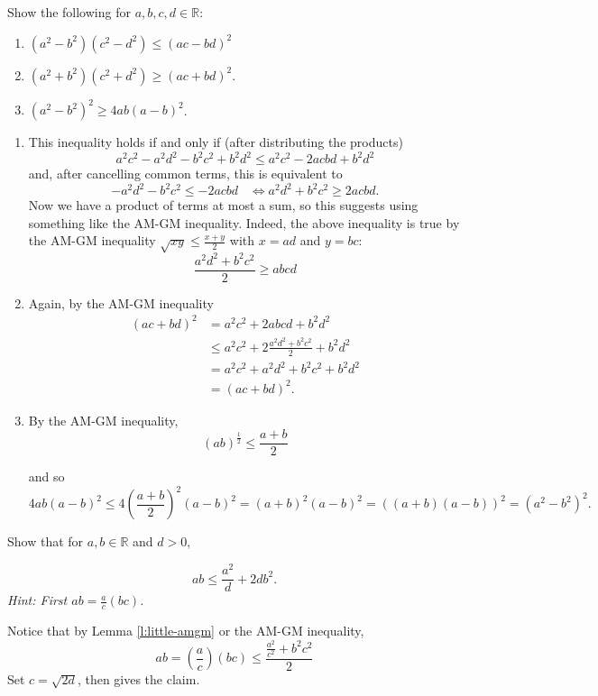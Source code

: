 \documentclass[11pt,dvipsnames]{book}
\def\R{\mathbb{R}}
\numberwithin{figure}{section} %
\numberwithin{table}{section} %
\begin{document}
\begin{exercise} Show the following for $a,b,c,d\in\mathbb{R}$:
\begin{enumerate}[label=(\alph*)]
\item $(a^{2}-b^{2})(c^2-d^2)\leq (ac-bd)^2 $
\item $(a^2+b^2)(c^2+d^2)\geq (ac+bd)^2$.
\item $(a^2-b^2)^2\geq 4ab(a-b)^2$.
\end{enumerate}

\begin{solution}
\begin{enumerate}[label=(\alph*)]
\item This inequality holds if and only if (after distributing the products)
\[
a^2c^2-a^2d^2-b^2c^2+b^2d^2\leq a^2c^2-2acbd+b^2d^2\]
and, after cancelling common terms, this is equivalent to
\[
-a^2d^2-b^2c^2\leq -2acbd \;\;\; \Longleftrightarrow a^2d^2+b^2c^2\geq 2acbd.
\]
Now we have a product of terms at most a sum, so this suggests using something like the AM-GM inequality. Indeed, the above inequality is true by the AM-GM inequality $\sqrt{xy}\leq \frac{x+y}{2}$ with $x=ad$ and $y=bc$:
\[
\frac{a^{2}d^{2}+b^2c^2}{2}
\geq abcd
\]
\item Again, by the AM-GM inequality
\begin{align*}
(ac+bd)^2
& = a^{2}c^{2}+2abcd+b^{2}d^{2}\\
& \leq a^{2}c^{2}+2\frac{a^2d^2+b^2c^2}{2}+b^{2}d^{2}\\
& =a^{2}c^{2}+a^{2}d^{2}+b^{2}c^{2}+b^{2}d^{2}\\
&= (ac+bd)^2.
\end{align*}

\item By the AM-GM inequality,
\[
(ab)^{\frac{1}{2}} \leq \frac{a+b}{2}
\]

 and so
\[
4ab(a-b)^2
\leq 4 \left(\frac{a+b}{2}\right)^2(a-b)^2=(a+b)^2(a-b)^2=((a+b)(a-b))^2=(a^2-b^2)^2.
\]
\end{enumerate}
\end{solution}

\end{exercise}

\begin{exercise} Show that for $a,b\in\R$ and $d>0$,

\[
ab \leq \frac{a^2}{d} + 2db^2.
\]
{\it Hint: First $ab=\frac{a}{c}(bc)$.}
\begin{solution}
Notice that by Lemma \ref{l:little-amgm} or the AM-GM inequality,
\[
ab = \left(\frac{a}{c}\right) (bc) \leq \frac{\frac{a^2}{c^2}+b^2c^2}{2}
\]
Set $c=\sqrt{2d}$, then gives the claim.
\end{solution}

\end{exercise}
\end{document}
